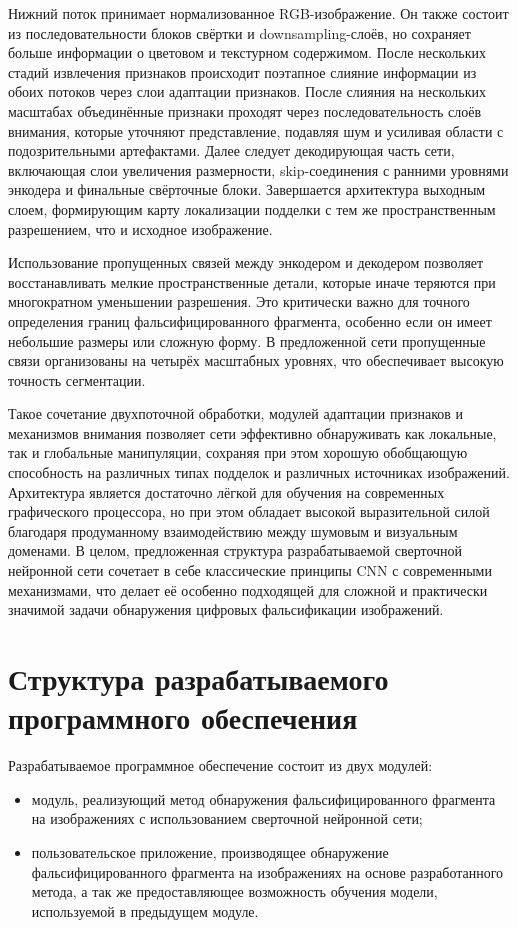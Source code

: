 Нижний поток принимает нормализованное RGB-изображение. Он также состоит из последовательности блоков свёртки и downsampling-слоёв, но сохраняет больше информации о цветовом и текстурном содержимом. После нескольких стадий извлечения признаков происходит поэтапное слияние информации из обоих потоков через слои адаптации признаков.
После слияния на нескольких масштабах объединённые признаки проходят через последовательность слоёв внимания, которые уточняют представление, подавляя шум и усиливая области с подозрительными артефактами. Далее следует декодирующая часть сети, включающая слои увеличения размерности, skip-соединения с ранними уровнями энкодера и финальные свёрточные блоки. Завершается архитектура выходным слоем, формирующим карту локализации подделки с тем же пространственным разрешением, что и исходное изображение.

Использование пропущенных связей между энкодером и декодером позволяет восстанавливать мелкие пространственные детали, которые иначе теряются при многократном уменьшении разрешения. Это критически важно для точного определения границ фальсифицированного фрагмента, особенно если он имеет небольшие размеры или сложную форму. В предложенной сети пропущенные связи организованы на четырёх масштабных уровнях, что обеспечивает высокую точность сегментации.

Такое сочетание двухпоточной обработки, модулей адаптации признаков и механизмов внимания позволяет сети эффективно обнаруживать как локальные, так и глобальные манипуляции, сохраняя при этом хорошую обобщающую способность на различных типах подделок и различных источниках изображений. Архитектура является достаточно лёгкой для обучения на современных графического процессора, но при этом обладает высокой выразительной силой благодаря продуманному взаимодействию между шумовым и визуальным доменами.
В целом, предложенная структура разрабатываемой сверточной нейронной сети сочетает в себе классические принципы CNN  с современными механизмами, что делает её особенно подходящей для сложной и практически значимой задачи обнаружения цифровых фальсификации изображений.

\section{Структура разрабатываемого программного обеспечения}

Разрабатываемое программное обеспечение состоит из двух модулей:
\begin{itemize}[label=---]
    \item модуль, реализующий метод обнаружения фальсифицированного фрагмента на изображениях с использованием сверточной нейронной сети;
    \item пользовательское приложение, производящее обнаружение фальсифицированного фрагмента на изображениях на основе разработанного метода, а так же предоставляющее возможность обучения модели, используемой в предыдущем модуле.
\end{itemize}
